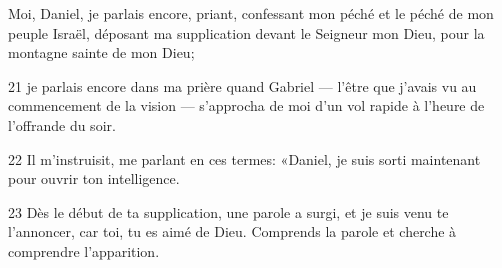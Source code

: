 Moi, Daniel, je parlais encore, priant, confessant mon péché et le péché de mon peuple Israël, déposant ma supplication devant le Seigneur mon Dieu, pour la montagne sainte de mon Dieu;

21 je parlais encore dans ma prière quand Gabriel --- l’être que j’avais vu au commencement de la vision --- s’approcha de moi d’un vol rapide à l’heure de l’offrande du soir.

22 Il m’instruisit, me parlant en ces termes: «Daniel, je suis sorti maintenant pour ouvrir ton intelligence.

23 Dès le début de ta supplication, une parole a surgi, et je suis venu te l’annoncer, car toi, tu es aimé de Dieu. Comprends la parole et cherche à comprendre l’apparition.
